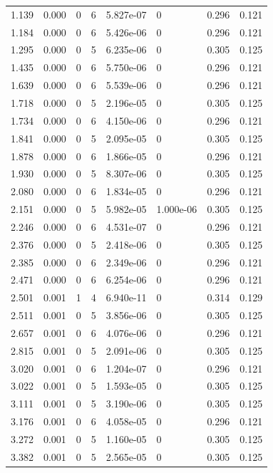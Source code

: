 \documentclass[preview]{standalone}
\begin{document}
{{\begin{tabular}{L{1.2cm}C{1.2cm} C{0.3cm}C{0.5cm} C{1.4cm}C{1.4cm} C{1.4cm}C{1.4cm}}
  1.139  &  0.000  & 0     &  6 &  5.827e-07  & 0  & 0.296 &  0.121   \\ 
  1.184  &  0.000  & 0     &  6 &  5.426e-06  & 0  & 0.296 &  0.121   \\ 
  1.295  &  0.000  & 0     &  5 &  6.235e-06  & 0  & 0.305 &  0.125   \\ 
  1.435  &  0.000  & 0     &  6 &  5.750e-06  & 0  & 0.296 &  0.121   \\ 
  1.639  &  0.000  & 0     &  6 &  5.539e-06  & 0  & 0.296 &  0.121   \\ 
  1.718  &  0.000  & 0     &  5 &  2.196e-05  & 0  & 0.305 &  0.125   \\ 
  1.734  &  0.000  & 0     &  6 &  4.150e-06  & 0  & 0.296 &  0.121   \\ 
  1.841  &  0.000  & 0     &  5 &  2.095e-05  & 0  & 0.305 &  0.125   \\ 
  1.878  &  0.000  & 0     &  6 &  1.866e-05  & 0  & 0.296 &  0.121   \\ 
  1.930  &  0.000  & 0     &  5 &  8.307e-06  & 0  & 0.305 &  0.125   \\ 
  2.080  &  0.000  & 0     &  6 &  1.834e-05  & 0  & 0.296 &  0.121   \\ 
  2.151  &  0.000  & 0     &  5 &  5.982e-05  & 1.000e-06  & 0.305 &  0.125   \\ 
  2.246  &  0.000  & 0     &  6 &  4.531e-07  & 0  & 0.296 &  0.121   \\ 
  2.376  &  0.000  & 0     &  5 &  2.418e-06  & 0  & 0.305 &  0.125   \\ 
  2.385  &  0.000  & 0     &  6 &  2.349e-06  & 0  & 0.296 &  0.121   \\ 
  2.471  &  0.000  & 0     &  6 &  6.254e-06  & 0  & 0.296 &  0.121   \\ 
  2.501  &  0.001  & 1     &  4 &  6.940e-11  & 0  & 0.314 &  0.129   \\ 
  2.511  &  0.001  & 0     &  5 &  3.856e-06  & 0  & 0.305 &  0.125   \\ 
  2.657  &  0.001  & 0     &  6 &  4.076e-06  & 0  & 0.296 &  0.121   \\ 
  2.815  &  0.001  & 0     &  5 &  2.091e-06  & 0  & 0.305 &  0.125   \\ 
  3.020  &  0.001  & 0     &  6 &  1.204e-07  & 0  & 0.296 &  0.121   \\ 
  3.022  &  0.001  & 0     &  5 &  1.593e-05  & 0  & 0.305 &  0.125   \\ 
  3.111  &  0.001  & 0     &  5 &  3.190e-06  & 0  & 0.305 &  0.125   \\ 
  3.176  &  0.001  & 0     &  6 &  4.058e-05  & 0  & 0.296 &  0.121   \\ 
  3.272  &  0.001  & 0     &  5 &  1.160e-05  & 0  & 0.305 &  0.125   \\ 
  3.382  &  0.001  & 0     &  5 &  2.565e-05  & 0  & 0.305 &  0.125   \\ 
\hline 
\end{tabular} 

}}
\end{document}
